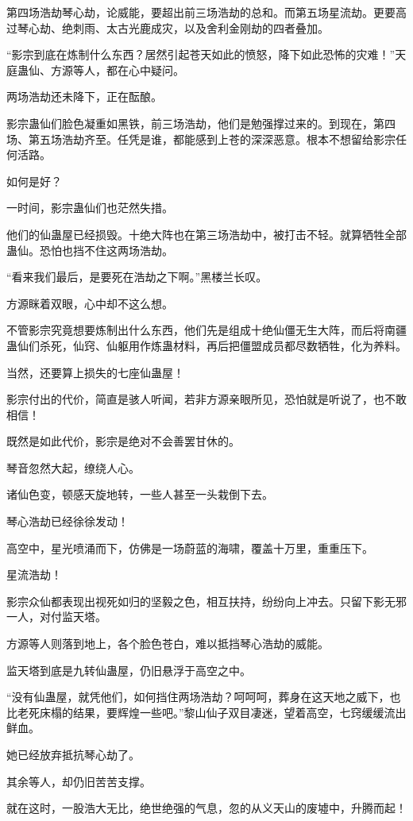 \begin{this_body}
第四场浩劫琴心劫，论威能，要超出前三场浩劫的总和。而第五场星流劫。更要高过琴心劫、绝刺雨、太古光鹿成灾，以及舍利金刚劫的四者叠加。

“影宗到底在炼制什么东西？居然引起苍天如此的愤怒，降下如此恐怖的灾难！”天庭蛊仙、方源等人，都在心中疑问。

两场浩劫还未降下，正在酝酿。

影宗蛊仙们脸色凝重如黑铁，前三场浩劫，他们是勉强撑过来的。到现在，第四场、第五场浩劫齐至。任凭是谁，都能感到上苍的深深恶意。根本不想留给影宗任何活路。

如何是好？

一时间，影宗蛊仙们也茫然失措。

他们的仙蛊屋已经损毁。十绝大阵也在第三场浩劫中，被打击不轻。就算牺牲全部蛊仙。恐怕也挡不住这两场浩劫。

“看来我们最后，是要死在浩劫之下啊。”黑楼兰长叹。

方源眯着双眼，心中却不这么想。

不管影宗究竟想要炼制出什么东西，他们先是组成十绝仙僵无生大阵，而后将南疆蛊仙们杀死，仙窍、仙躯用作炼蛊材料，再后把僵盟成员都尽数牺牲，化为养料。

当然，还要算上损失的七座仙蛊屋！

影宗付出的代价，简直是骇人听闻，若非方源亲眼所见，恐怕就是听说了，也不敢相信！

既然是如此代价，影宗是绝对不会善罢甘休的。

琴音忽然大起，缭绕人心。

诸仙色变，顿感天旋地转，一些人甚至一头栽倒下去。

琴心浩劫已经徐徐发动！

高空中，星光喷涌而下，仿佛是一场蔚蓝的海啸，覆盖十万里，重重压下。

星流浩劫！

影宗众仙都表现出视死如归的坚毅之色，相互扶持，纷纷向上冲去。只留下影无邪一人，对付监天塔。

方源等人则落到地上，各个脸色苍白，难以抵挡琴心浩劫的威能。

监天塔到底是九转仙蛊屋，仍旧悬浮于高空之中。

“没有仙蛊屋，就凭他们，如何挡住两场浩劫？呵呵呵，葬身在这天地之威下，也比老死床榻的结果，要辉煌一些吧。”黎山仙子双目凄迷，望着高空，七窍缓缓流出鲜血。

她已经放弃抵抗琴心劫了。

其余等人，却仍旧苦苦支撑。

就在这时，一股浩大无比，绝世绝强的气息，忽的从义天山的废墟中，升腾而起！


\end{this_body}

